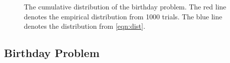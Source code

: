 \documentclass[12pt]{article}
\theoremstyle{definition}
\DeclareMathOperator{\pr}{\mathrm{P}}		     %
\DeclareMathOperator{\cov}{\uptau_\textrm{cov}}  %
\begin{document}
\begin{figure}[ht]
\centering
{}
\caption{The cumulative distribution of the birthday problem. The red line denotes the empirical distribution from 1000 trials. The blue line denotes the distribution from \cref{eqn:dist}.}\label{fig:birthday}
\end{figure}


\clearpage
{}

\newpage
\begin{appendices}
\subsection{Birthday Problem}\label{app:birthday}

\end{appendices}
\end{document}
